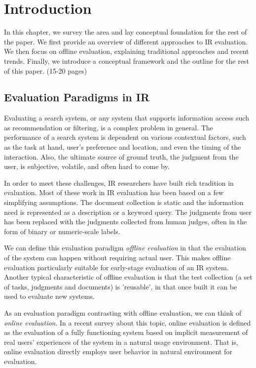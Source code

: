 \documentclass[openany]{now} %
\begin{document}
\chapter{Introduction}
\label{c-intro}

In this chapter, we survey the area and lay conceptual foundation for the rest of the paper. We first provide an overview of different approaches to IR evaluation. We then focus on offline evaluation, explaining traditional approaches and recent trends. Finally, we introduce a conceptual framework and the outline for the rest of this paper. (15-20 pages)

\section{Evaluation Paradigms in IR}

Evaluating a search system, or any system that supports information access such as recommendation or filtering, is a complex problem in general. The performance of a search system is dependent on various contextual factors, such as the task at hand, user's preference and location, and even the timing of the interaction. Also, the ultimate source of ground truth, the judgment from the user, is subjective, volatile, and often hard to come by.

In order to meet these challenges, IR researchers have built rich tradition in evaluation. Most of these work in IR evaluation has been based on a few simplifying assumptions. The document collection is static and the information need is represented as a description or a keyword query. The judgments from user has been replaced with the judgments collected from human judges, often in the form of binary or numeric-scale labels.

We can define this evaluation paradigm \textit{offline evaluation} in that the evaluation of the system can happen without requiring actual user. This makes offline evaluation particularly suitable for early-stage evaluation of an IR system. Another typical characteristic of offline evaluation is that the test collection (a set of tasks, judgments and documents) is 'reusable', in that once built it can be used to evaluate new systems.

As an evaluation paradigm contrasting with offline evaluation, we can think of \textit{online evaluation}. In a recent survey \cite{INR-XYZ} about this topic, online evaluation is defined as the evaluation of a fully functioning
system based on implicit measurement of real users' experiences of the
system in a natural usage environment. That is, online evaluation directly employs user behavior in natural environment for evaluation.
\end{document}
